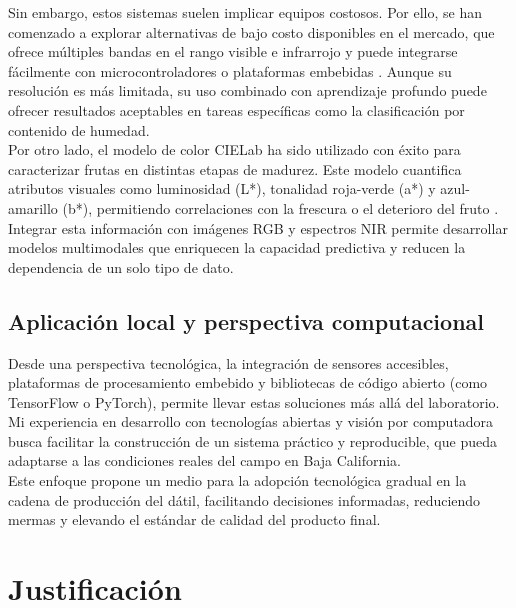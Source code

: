 Sin embargo, estos sistemas suelen implicar equipos costosos. Por ello, se han comenzado a explorar alternativas de bajo costo disponibles en el mercado, que ofrece múltiples bandas en el rango visible e infrarrojo y puede integrarse fácilmente con microcontroladores o plataformas embebidas \parencite{passos_deep_2023}. Aunque su resolución es más limitada, su uso combinado con aprendizaje profundo puede ofrecer resultados aceptables en tareas específicas como la clasificación por contenido de humedad.\\

Por otro lado, el modelo de color CIELab ha sido utilizado con éxito para caracterizar frutas en distintas etapas de madurez. Este modelo cuantifica atributos visuales como luminosidad (L*), tonalidad roja-verde (a*) y azul-amarillo (b*), permitiendo correlaciones con la frescura o el deterioro del fruto \parencite{habib_external_2022}. Integrar esta información con imágenes RGB y espectros NIR permite desarrollar modelos multimodales que enriquecen la capacidad predictiva y reducen la dependencia de un solo tipo de dato.\\

\subsection{Aplicación local y perspectiva computacional}

Desde una perspectiva tecnológica, la integración de sensores accesibles, plataformas de procesamiento embebido y bibliotecas de código abierto (como TensorFlow o PyTorch), permite llevar estas soluciones más allá del laboratorio. Mi experiencia en desarrollo con tecnologías abiertas y visión por computadora busca facilitar la construcción de un sistema práctico y reproducible, que pueda adaptarse a las condiciones reales del campo en Baja California.\\

Este enfoque propone un medio para la adopción tecnológica gradual en la cadena de producción del dátil, facilitando decisiones informadas, reduciendo mermas y elevando el estándar de calidad del producto final.\\


\section{Justificación}

